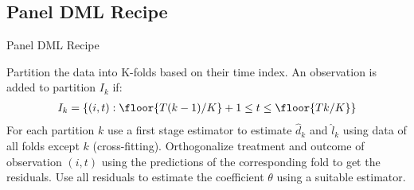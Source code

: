\subsection*{Panel DML Recipe}
\begin{algorithm}
    \caption{Panel DML Recipe}
    \begin{algorithmic}[1]
        \State Partition the data into K-folds based on their time index. An observation is added to partition $I_k$ if: 
            \begin{align} 
                I_k=\left\{(i, t) : \floor{T(k-1)/K}+1 \leq t \leq \floor{Tk/K}\right\}
            \end{align} 
        \State For each partition $k$ use a first stage estimator to estimate $\hat{d}_k$ and $\hat{l}_k$ using data of all folds except $k$ (cross-fitting). 
        \State Orthogonalize treatment and outcome of observation $(i, t)$ using the predictions of the corresponding fold to get the residuals. 
        \State Use all residuals to estimate the coefficient $\theta$ using a suitable estimator.  
    \end{algorithmic}
\end{algorithm}

